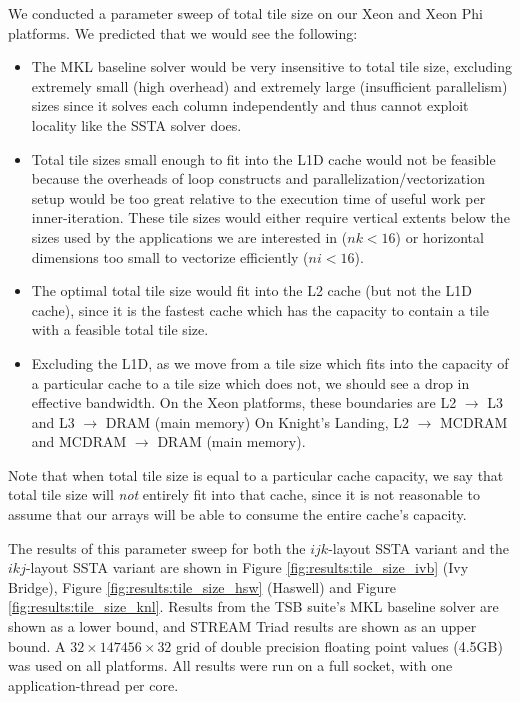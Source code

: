 \documentclass{sig-alternate-05-2015}
\begin{document}
We conducted a parameter sweep of total tile size on our Xeon and Xeon Phi 
  platforms.
We predicted that we would see the following: 
\begin{itemize}
\item The MKL baseline solver would be very insensitive to total tile size,
  excluding extremely small (high overhead) and extremely large (insufficient
  parallelism) sizes since it solves each column independently and thus cannot
  exploit locality like the SSTA solver does.
\item Total tile sizes small enough to fit into the L1D cache would not be feasible
  because the overheads of loop constructs and parallelization/vectorization
  setup would be too great relative to the execution time of useful work per
  inner-iteration.
These tile sizes would either require vertical extents below the sizes used
  by the applications we are interested in (\(nk < 16\)) or horizontal
  dimensions too small to vectorize efficiently (\(ni < 16\)).
\item The optimal total tile size would fit into the L2 cache (but not the L1D
  cache), since it is the fastest cache which has the capacity to contain a
  tile with a feasible total tile size.
\item Excluding the L1D, as we move from a tile size which fits into the
  capacity of a particular cache to a tile size which does not, we should see a
  drop in effective bandwidth.
On the Xeon platforms, these boundaries are L2 \(\rightarrow\) L3 and L3
  \(\rightarrow\) DRAM (main memory)
On Knight's Landing, L2 \(\rightarrow\) MCDRAM and MCDRAM \(\rightarrow\) DRAM
  (main memory).
\end{itemize}
Note that when total tile size is equal to a particular cache capacity, we say
  that total tile size will \emph{not} entirely fit into that cache, since it is
  not reasonable to assume that our arrays will be able to consume the entire
  cache's capacity.

The results of this parameter sweep for both the \(ijk\)-layout SSTA variant and
  the \(ikj\)-layout SSTA variant are shown in Figure
  \ref{fig:results:tile_size_ivb} (Ivy Bridge), Figure
  \ref{fig:results:tile_size_hsw} (Haswell) and Figure
  \ref{fig:results:tile_size_knl}.
Results from the TSB suite's MKL baseline solver are shown as a lower bound,
  and STREAM Triad results are shown as an upper bound. 
A \(32 \times 147456 \times 32\) grid of double precision floating point values
  (4.5GB) was used on all platforms.
All results were run on a full socket, with one application-thread per core.
\end{document}
